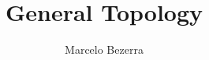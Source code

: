 \documentclass[a4paper,12pt]{book}
\title{General Topology}
\author{Marcelo Bezerra}
\begin{document}
\frontmatter

\tableofcontents

\mainmatter




\backmatter

\nocite{*}

\end{document}
